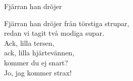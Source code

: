 \begin{song}{Fjärran han dröjer}

	
	
	Fjärran han dröjer från törstiga strupar,\\
	redan vi tagit två modiga supar.\\
	Ack, lilla tersen,\\
	ack, lilla hjärtevännen,\\
	kommer du ej snart?\\
	Jo, jag kommer strax!
	
\end{song}
